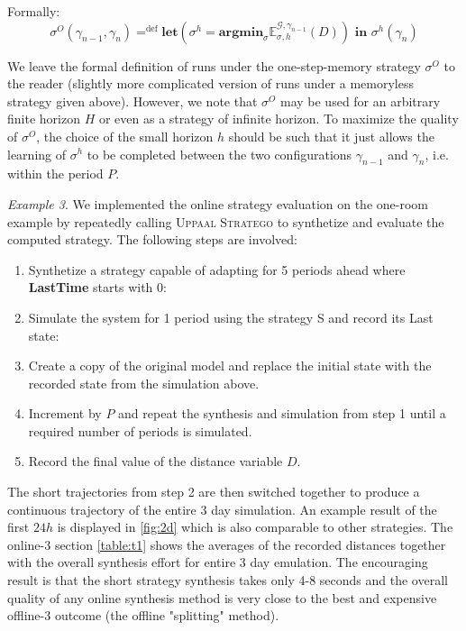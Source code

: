     Formally:
    \begin{equation*}
        \sigma^O (\gamma_{n-1},\gamma_{n}) =^{\text{def}} \textbf{let}(\sigma^h = \textbf{argmin}_{\sigma}\mathbb{E}^{\mathcal{G},\gamma_{n-1}}_{\sigma,h}(D) ) \textbf{ in } \sigma^h(\gamma_n) 
    \end{equation*}

    We leave the formal definition of runs under the one-step-memory strategy $\sigma^O$
    to the reader (slightly more complicated version of runs under a memoryless strategy given above).
    However, we note that $\sigma^O$ may be used for an arbitrary finite horizon $H$ or 
    even as a strategy of infinite horizon. To maximize the quality of $\sigma^O$, the choice
    of the small horizon $h$ should be such that it just allows the learning of $\sigma^h$
    to be completed between the two configurations $\gamma_{n-1}$ and $\gamma_n$, i.e.
    within the period $P$.  

    \emph{Example 3}. We implemented the online strategy evaluation on the one-room 
    example by repeatedly calling \textsc{Uppaal Stratego} to synthetize 
    and evaluate the computed strategy. The following steps are involved:
    
    \begin{enumerate}
      \item Synthetize a strategy capable of adapting for 5 periods ahead where 
      \textbf{LastTime} starts with 0: \textbf{ }
      \item Simulate the system for 1 period using the strategy S and record its Last
      state: \textbf{ }
      \item Create a copy of the original model and replace the initial state with the 
      recorded state from the simulation above.
      \item Increment \textbf{} by $P$ and repeat the synthesis and 
      simulation from step 1 until a required number of periods is simulated.
      \item Record the final value of the distance variable $D$.
    \end{enumerate}    

    The short trajectories from step 2 are then switched together to produce 
    a continuous trajectory of the entire 3 day simulation. An example result of 
    the first $24h$ is displayed in \autoref{fig:2d} which is also comparable 
    to other strategies. The online-3 section \autoref{table:t1} shows the averages
    of the recorded distances together with the overall synthesis effort for 
    entire 3 day emulation. The encouraging result is that the short strategy 
    synthesis takes only 4-8 seconds and the overall quality of any online 
    synthesis method is very close to the best and expensive offline-3 outcome 
    (the offline "splitting" method).


